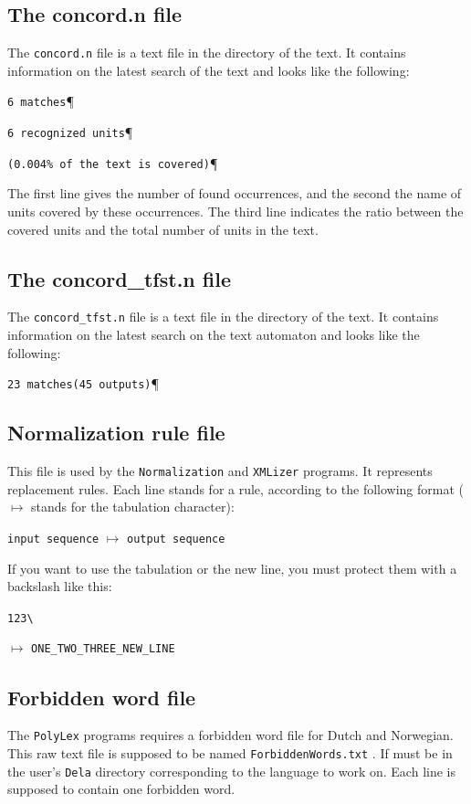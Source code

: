 \subsection{The concord.n file}
The \verb+concord.n+ file is a text file in the directory of the text. It
contains information on the latest search of the text and looks like the
following:


\bigskip
\verb$6 matches$\P

\verb$6 recognized units$\P

\verb$(0.004% of the text is covered)$\P

\bigskip
\noindent The first line gives the number of found occurrences, and the second the name of
units covered by these occurrences. The third line indicates the ratio between
the covered units and the total number of units in the text.


\subsection{The concord\_tfst.n file}
The \verb+concord_tfst.n+ file is a text file in the directory of the text. It
contains information on the latest search on the text automaton and looks like
the following:

\bigskip
\verb$23 matches(45 outputs)$\P



\subsection{Normalization rule file}
\label{section-normalization-file}
This file is used by the \verb+Normalization+ and \verb+XMLizer+ programs. It
represents replacement rules. Each line stands for a rule, according to the
following format ($\longmapsto$ stands for the tabulation character):

\bigskip
\noindent \verb+input sequence+ $\longmapsto$ \verb+output sequence+

\bigskip
\noindent If you want to use the tabulation or the new line, you must protect
them with a backslash like this:

\bigskip
\noindent
\verb+123\+

\noindent
$\longmapsto$ \verb+ONE_TWO_THREE_NEW_LINE+



\subsection{Forbidden word file}
 \label{section-forbidden-words}
The \verb+PolyLex+ programs requires a forbidden word file for Dutch and
Norwegian. This raw text file is supposed to be named \verb+ForbiddenWords.txt+
. If must be in the user's \verb+Dela+
directory corresponding to the language to work on. Each line is supposed to
contain one forbidden word.



